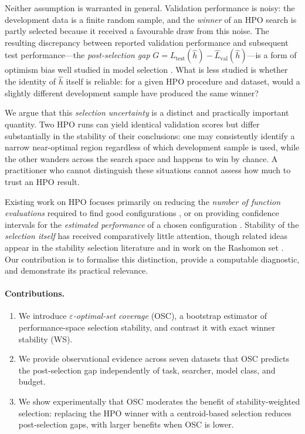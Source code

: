 \documentclass[twoside]{article}
\newcommand{\hhat}{\hat{h}}
\newcommand{\Lval}{\hat{L}_{\mathrm{val}}}
\newcommand{\Ltest}{L_{\mathrm{test}}}
\begin{document}
Neither assumption is warranted in general. Validation performance is
noisy: the development data is a finite random sample, and the
\emph{winner} of an HPO search is partly selected because it received a
favourable draw from this noise. The resulting discrepancy between
reported validation performance and subsequent test performance---the
\emph{post-selection gap} $G = \Ltest(\hhat) - \Lval(\hhat)$---is a
form of optimism bias well studied in model selection \citep{arlot2010survey,
cawley2010over,barnston1992long}. What is less studied is whether the
identity of $\hhat$ itself is reliable: for a given HPO procedure and
dataset, would a slightly different development sample have produced the
same winner?

We argue that this \emph{selection uncertainty} is a distinct and
practically important quantity. Two HPO runs can yield identical
validation scores but differ substantially in the stability of their
conclusions: one may consistently identify a narrow near-optimal region
regardless of which development sample is used, while the other
wanders across the search space and happens to win by chance. A practitioner
who cannot distinguish these situations cannot assess how much to trust
an HPO result.

Existing work on HPO focuses primarily on reducing the
\emph{number of function evaluations} required to find good configurations
\citep{snoek2012practical, li2018hyperband, falkner2018bohb,
bergstra2011algorithms}, or on providing confidence intervals for the
\emph{estimated performance} of a chosen configuration
\citep{dodge2019show, bouthillier2021accounting}. Stability
of the \emph{selection itself} has received comparatively little
attention, though related ideas appear in the stability selection
literature \citep{meinshausen2010stability} and in work on the
Rashomon set \citep{breiman2001random, semenova2022existence,
d2022underspecification}. Our contribution is to formalise this
distinction, provide a computable diagnostic, and demonstrate its
practical relevance.

\paragraph{Contributions.}
\begin{enumerate}\setlength\itemsep{2pt}
  \item We introduce \emph{$\varepsilon$-optimal-set coverage} (OSC), a
    bootstrap estimator of performance-space selection stability, and
    contrast it with exact winner stability (WS).
  \item We provide observational evidence across seven datasets that OSC
    predicts the post-selection gap independently of task, searcher,
    model class, and budget.
  \item We show experimentally that OSC moderates the benefit of
    stability-weighted selection: replacing the HPO winner with a
    centroid-based selection reduces post-selection gaps, with larger
    benefits when OSC is lower.
\end{enumerate}
\end{document}

